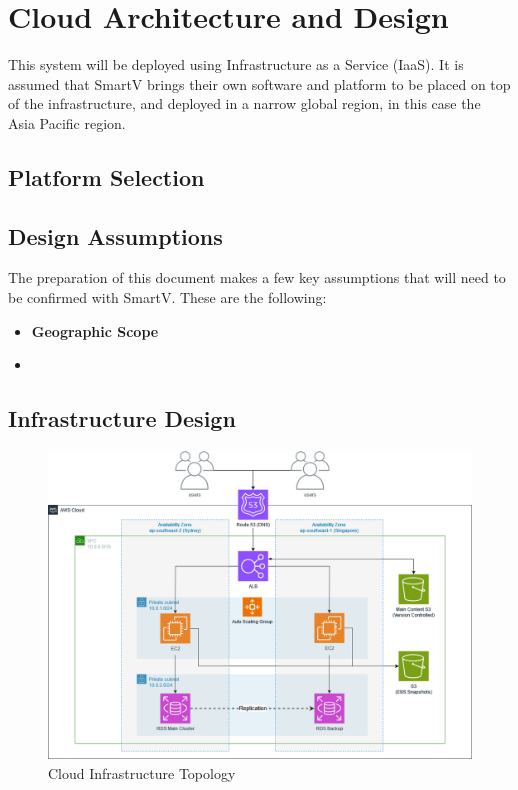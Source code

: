 \section{Cloud Architecture and Design}

This system will be deployed using Infrastructure as a Service (IaaS). It is assumed that SmartV brings their own software and platform to be placed on top of the infrastructure, and deployed in a narrow global region, in this case the Asia Pacific region.

\subsection{Platform Selection}



\subsection{Design Assumptions}

The preparation of this document makes a few key assumptions that will need to be confirmed with SmartV. These are the following: 

\begin{itemize}
    \item \textbf{Geographic Scope}
    \item \textbf{}
\end{itemize}

\subsection{Infrastructure Design}

\begin{figure}[H]\label{fig:awsdiagram}
    \centering
    \includegraphics[width=\textwidth]{cci_aws}
    \caption{Cloud Infrastructure Topology}
\end{figure}


